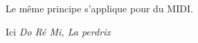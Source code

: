 \documentclass[preview]{standalone}
\begin{document}
\begin{center}
Le même principe s'applique pour du MIDI.
    
    Ici \em{Do Ré Mi, La perdrix}
\end{center}
\end{document}
